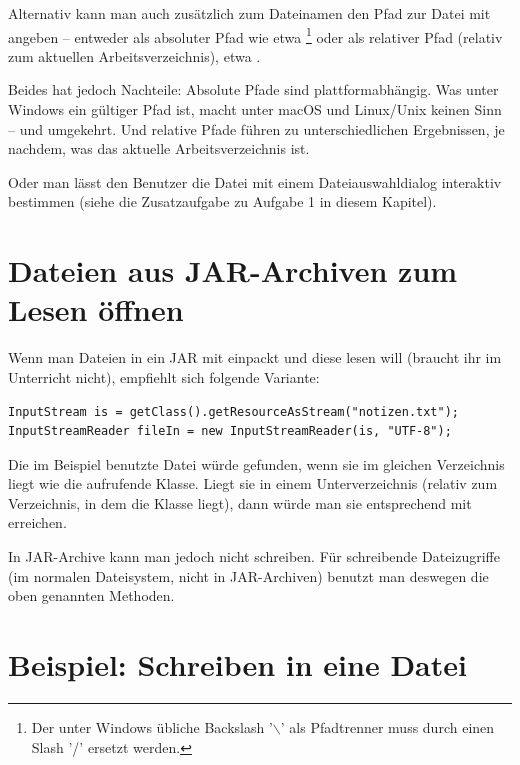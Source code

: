 Alternativ kann man auch zusätzlich zum Dateinamen den Pfad zur Datei mit
angeben -- entweder als absoluter Pfad wie etwa
\footnote{Der unter Windows
übliche Backslash '\ensuremath{\backslash}' als Pfadtrenner muss durch einen
Slash '/' ersetzt werden.} oder als relativer Pfad (relativ zum aktuellen
Arbeitsverzeichnis), etwa .

Beides hat jedoch Nachteile: Absolute Pfade sind plattformabhängig. Was unter
Windows ein gültiger Pfad ist, macht unter macOS und Linux/Unix keinen Sinn --
und umgekehrt. Und relative Pfade führen zu unterschiedlichen Ergebnissen, je
nachdem, was das aktuelle Arbeitsverzeichnis ist.

Oder man lässt den Benutzer die Datei mit einem Dateiauswahldialog interaktiv
bestimmen (siehe die Zusatzaufgabe zu Aufgabe 1 in diesem Kapitel).


\section{Dateien aus JAR-Archiven zum Lesen öffnen}

Wenn man Dateien in ein JAR mit einpackt und diese lesen will (braucht ihr im
Unterricht nicht), empfiehlt sich folgende Variante:

\begin{lstlisting}
InputStream is = getClass().getResourceAsStream("notizen.txt");
InputStreamReader fileIn = new InputStreamReader(is, "UTF-8");
\end{lstlisting}

Die im Beispiel benutzte Datei  würde gefunden, wenn sie im
gleichen Verzeichnis liegt wie die aufrufende Klasse. Liegt sie in einem
Unterverzeichnis (relativ zum Verzeichnis, in dem die Klasse liegt), dann würde
man sie entsprechend mit  erreichen.

In JAR-Archive kann man jedoch nicht schreiben. Für schreibende Dateizugriffe
(im normalen Dateisystem, nicht in JAR-Archiven) benutzt man deswegen die oben
genannten Methoden.


\section{Beispiel: Schreiben in eine Datei}

